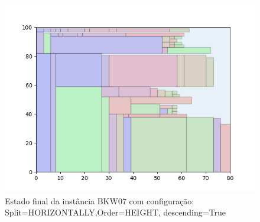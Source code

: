 \begin{figure}[H]
    \centering
    \caption[]{Estado final da instância BKW07 com configuração: Split=HORIZONTALLY,Order=HEIGHT, descending=True}
    \label{fig:bkw07-horizontally-height-true}
    \includegraphics[scale=0.5]{output/figures/bkw/bkw07/horizontally/height/true/00}
\end{figure}